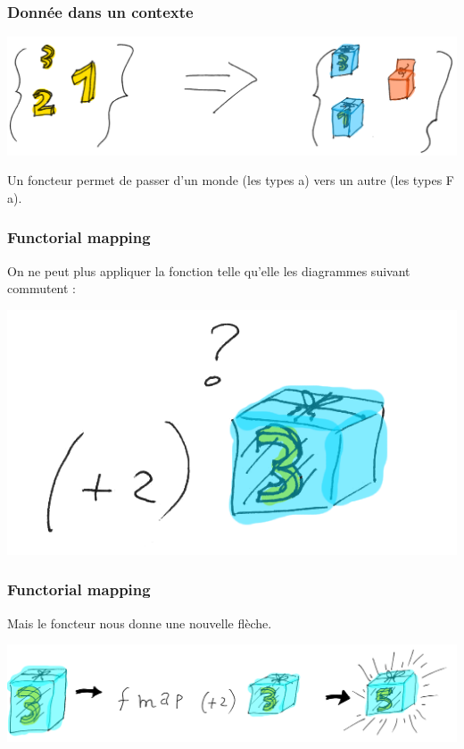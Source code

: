 \documentclass{beamer}
\begin{document}
\begin{frame}
\frametitle{Donnée dans un contexte}

\begin{center}
\includegraphics[scale=0.25]{a2fa.png}
\end{center}

\begin{block}{}
Un foncteur permet de passer d'un monde (les types a) vers un autre (les types F a).
\end{block}

\end{frame}

\begin{frame}
\frametitle{Functorial mapping}
On ne peut plus appliquer la fonction telle qu'elle les diagrammes suivant commutent :

\begin{center}
\includegraphics[scale=0.3]{wrong_type.png}
\end{center}
\end{frame}

\begin{frame}
\frametitle{Functorial mapping}
Mais le foncteur nous donne une nouvelle flèche.
\begin{center}
\includegraphics[scale=0.19]{f_fct.png}
\end{center}
\end{frame}
\end{document}
